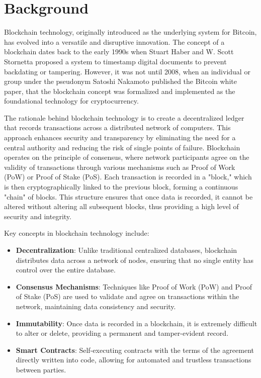 \documentclass[../main.tex]{subfiles}
\begin{document}
\section{Background}\label{sec:background}
Blockchain technology, originally introduced as the underlying system for Bitcoin, has evolved into a versatile and disruptive innovation. The concept of a blockchain dates back to the early 1990s when Stuart Haber and W. Scott Stornetta proposed a system to timestamp digital documents to prevent backdating or tampering. However, it was not until 2008, when an individual or group under the pseudonym Satoshi Nakamoto published the Bitcoin white paper, that the blockchain concept was formalized and implemented as the foundational technology for cryptocurrency.

The rationale behind blockchain technology is to create a decentralized ledger that records transactions across a distributed network of computers. This approach enhances security and transparency by eliminating the need for a central authority and reducing the risk of single points of failure. Blockchain operates on the principle of consensus, where network participants agree on the validity of transactions through various mechanisms such as Proof of Work (PoW) or Proof of Stake (PoS). Each transaction is recorded in a "block," which is then cryptographically linked to the previous block, forming a continuous "chain" of blocks. This structure ensures that once data is recorded, it cannot be altered without altering all subsequent blocks, thus providing a high level of security and integrity.

Key concepts in blockchain technology include:

\begin{itemize}
    \item \textbf{Decentralization}: Unlike traditional centralized databases, blockchain distributes data across a network of nodes, ensuring that no single entity has control over the entire database.
    \item \textbf{Consensus Mechanisms}: Techniques like Proof of Work (PoW) and Proof of Stake (PoS) are used to validate and agree on transactions within the network, maintaining data consistency and security.
    \item \textbf{Immutability}: Once data is recorded in a blockchain, it is extremely difficult to alter or delete, providing a permanent and tamper-evident record.
    \item \textbf{Smart Contracts}: Self-executing contracts with the terms of the agreement directly written into code, allowing for automated and trustless transactions between parties.
\end{itemize}
\end{document}
